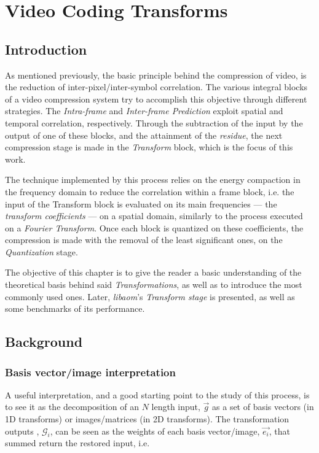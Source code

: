 \cleardoublepage
\chapter{Video Coding Transforms} \label{chap:trans}

\section{{Introduction}}

As mentioned previously, the basic principle behind the compression of video, is the reduction of inter-pixel/inter-symbol correlation. The various integral blocks of a video compression system try to accomplish this objective through different strategies. The \emph{Intra-frame} and \emph{Inter-frame Prediction} exploit spatial and temporal correlation, respectively. Through the subtraction of the input by the output of one of these blocks, and the attainment of the \emph{residue}, the next compression stage is made in the \emph{Transform} block, which is the focus of this work.

The technique implemented by this process relies on the energy compaction in the frequency domain to reduce the correlation within a frame block, i.e. the input of the Transform block is evaluated on its main frequencies --- the \emph{transform coefficients} --- on a spatial domain, similarly to the process executed on a \emph{Fourier Transform}. Once each block is quantized on these coefficients, the compression is made with the removal of the least significant ones, on the \emph{Quantization} stage. 

The objective of this chapter is to give the reader a basic understanding of the theoretical basis behind said \emph{Transformations}, as well as to introduce the most commonly used ones. Later, \emph{libaom}'s \emph{Transform stage} is presented, as well as some benchmarks of its performance.

\section{Background}
\subsection{Basis vector/image interpretation}
A useful interpretation, and a good starting point to the study of this process, is to see it as the decomposition of an $N$ length input, $\vec{g}$ as a set of basis vectors (in 1D transforms) or images/matrices (in 2D transforms). The transformation outputs , $\mathcal{G}_i$, can be seen as the weights of each basis vector/image, $\vec{e_i}$, that summed return the restored input, i.e.

